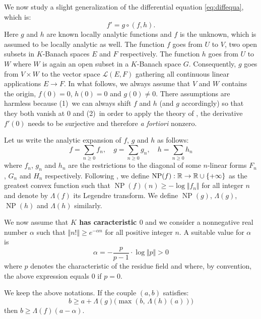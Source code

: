 \documentclass{sig-alternate}
\DeclareMathOperator{\NP}{NP}
\begin{document}
We now study a slight generalization of the differential equation 
\eqref{eq:diffequa}, which is:
\begin{equation}
\label{eq:diffequah}
f' = g \circ (f, h).
\end{equation}
Here $g$ and $h$ are known locally analytic functions and $f$ is the 
unknown, which is assumed to be locally analytic as well. The function
$f$ goes from $U$ to $V$, two open subsets in $K$-Banach spaces $E$ 
and $F$ respectively. The function $h$ goes from $U$ to $W$ where $W$
is again an open subset in a $K$-Banach space $G$. Consequently, $g$
goes from $V \times W$ to the vector space $\mathcal L(E,F)$ gathering
all continuous linear applications $E \to F$.
In what follows, we always assume that $V$ and $W$ contains the origin, 
$f(0) = 0$, $h(0) = 0$ and $g(0) \neq 0$. There assumptions are harmless 
because (1)~we can always shift $f$ and $h$ (and $g$ accordingly) so 
that they both vanish at $0$ and (2)~in order to apply the theory of 
\cite{padicprec}, the derivative $f'(0)$ needs to be surjective and 
therefore \emph{a fortiori} nonzero.

Let us write the analytic expansion of $f$, $g$ and $h$ as follows: 
$$f = \sum_{n \geq 0} f_n, \quad
g = \sum_{n \geq 0} g_n, \quad
h = \sum_{n \geq 0} h_n$$
where $f_n$, $g_n$ and $h_n$ are the restrictions to the diagonal of 
some $n$-linear forms $F_n$, $G_n$ and $H_n$ respectively.
Following \cite{padicprec}, we define $\NP(f) : \R \to \R \cup 
\{+\infty\}$ as the greatest convex function such that $\NP(f)(n) \geq - 
\log \Vert f_n \Vert$ for all integer $n$ and denote by $\Lambda(f)$ its 
Legendre transform. We define $\NP(g)$, $\Lambda(g)$, $\NP(h)$ and
$\Lambda(h)$ similarly.

We now assume that \textbf{$K$ has caracteristic $0$} and we consider a 
nonnegative real number $\alpha$ such that $\Vert n! \Vert \geq 
e^{-\alpha n}$ for all positive integer $n$. A suitable value for 
$\alpha$ is
$$\alpha = - \frac p {p-1} \cdot \log \Vert p \Vert > 0$$
where $p$ denotes the characteristic of the residue field and
where, by convention, the above expression equals $0$ if $p = 0$.

\begin{prop}
\label{prop:boundLambdaf}
We keep the above notations. If the couple $(a,b)$ satisfies:
\begin{equation}
\label{eq:condAB}
b \geq a + \Lambda(g)\big( \! \max(b, \, \Lambda(h) (a)) \big)
\end{equation}
then $b \geq \Lambda(f)(a - \alpha)$.
\end{prop}
\end{document}
